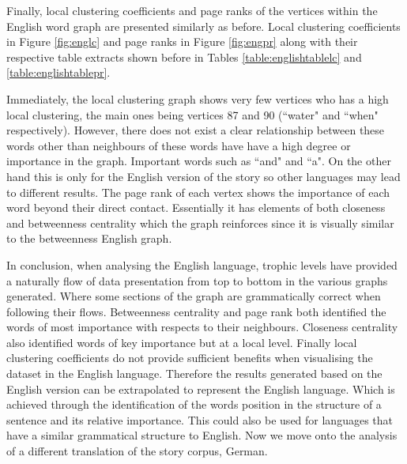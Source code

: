 Finally, local clustering coefficients and page ranks of the vertices within the English word graph are presented similarly as before.  Local clustering coefficients in Figure \ref{fig:englc} and page ranks in Figure \ref{fig:engpr} along with their respective table extracts shown before in Tables \ref{table:englishtablelc} and \ref{table:englishtablepr}. 

Immediately, the local clustering graph shows very few vertices who has a high local clustering, the main ones being vertices 87 and 90 (``water" and ``when" respectively). However, there does not exist a clear relationship between these words other than neighbours of these words have have a high degree or importance in the graph. Important words such as ``and" and ``a". On the other hand this is only for the English version of the story so other languages may lead to different results. The page rank of each vertex shows the importance of each word beyond their direct contact. Essentially it has elements of both closeness and betweenness centrality which the graph reinforces since it is visually similar to the betweenness English graph.

In conclusion, when analysing the English language, trophic levels have provided a naturally flow of data presentation from top to bottom in the various graphs generated. Where some sections of the graph are grammatically correct when following their flows. Betweenness centrality and page rank both identified the words of most importance with respects to their neighbours. Closeness centrality also identified words of key importance but at a local level. Finally local clustering coefficients do not provide sufficient benefits when visualising the dataset in the English language. Therefore the results generated based on the English version can be extrapolated to represent the English language. Which is achieved through the identification of the words position in the structure of a sentence and its relative importance. This could also be used for languages that have a similar grammatical structure to English. Now we move onto the analysis of a different translation of the story corpus, German.

